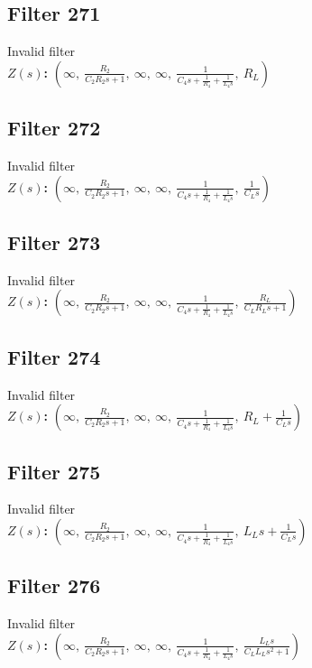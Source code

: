 \documentclass{article}
\begin{document}
\subsection*{Filter 271}
Invalid filter \\ 
\textbf{$Z(s)$:} $\left( \infty, \  \frac{R_{2}}{C_{2} R_{2} s + 1}, \  \infty, \  \infty, \  \frac{1}{C_{4} s + \frac{1}{R_{4}} + \frac{1}{L_{4} s}}, \  R_{L}\right)$ \\ 
\subsection*{Filter 272}
Invalid filter \\ 
\textbf{$Z(s)$:} $\left( \infty, \  \frac{R_{2}}{C_{2} R_{2} s + 1}, \  \infty, \  \infty, \  \frac{1}{C_{4} s + \frac{1}{R_{4}} + \frac{1}{L_{4} s}}, \  \frac{1}{C_{L} s}\right)$ \\ 
\subsection*{Filter 273}
Invalid filter \\ 
\textbf{$Z(s)$:} $\left( \infty, \  \frac{R_{2}}{C_{2} R_{2} s + 1}, \  \infty, \  \infty, \  \frac{1}{C_{4} s + \frac{1}{R_{4}} + \frac{1}{L_{4} s}}, \  \frac{R_{L}}{C_{L} R_{L} s + 1}\right)$ \\ 
\subsection*{Filter 274}
Invalid filter \\ 
\textbf{$Z(s)$:} $\left( \infty, \  \frac{R_{2}}{C_{2} R_{2} s + 1}, \  \infty, \  \infty, \  \frac{1}{C_{4} s + \frac{1}{R_{4}} + \frac{1}{L_{4} s}}, \  R_{L} + \frac{1}{C_{L} s}\right)$ \\ 
\subsection*{Filter 275}
Invalid filter \\ 
\textbf{$Z(s)$:} $\left( \infty, \  \frac{R_{2}}{C_{2} R_{2} s + 1}, \  \infty, \  \infty, \  \frac{1}{C_{4} s + \frac{1}{R_{4}} + \frac{1}{L_{4} s}}, \  L_{L} s + \frac{1}{C_{L} s}\right)$ \\ 
\subsection*{Filter 276}
Invalid filter \\ 
\textbf{$Z(s)$:} $\left( \infty, \  \frac{R_{2}}{C_{2} R_{2} s + 1}, \  \infty, \  \infty, \  \frac{1}{C_{4} s + \frac{1}{R_{4}} + \frac{1}{L_{4} s}}, \  \frac{L_{L} s}{C_{L} L_{L} s^{2} + 1}\right)$ \\ 
\end{document}
